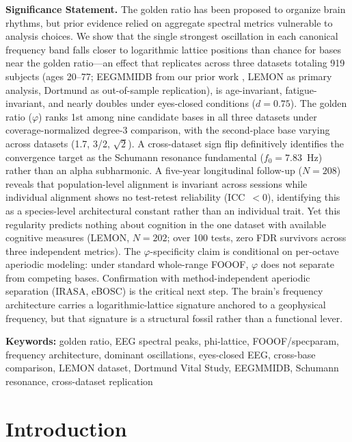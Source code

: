 \documentclass[11pt,a4paper]{article}
\newcommand{\phisym}{\varphi}
\begin{document}
\bigskip
\noindent\textbf{Significance Statement.}
The golden ratio has been proposed to organize brain rhythms, but prior evidence relied on aggregate spectral metrics vulnerable to analysis choices. We show that the single strongest oscillation in each canonical frequency band falls closer to logarithmic lattice positions than chance for bases near the golden ratio---an effect that replicates across three datasets totaling 919 subjects (ages 20--77; EEGMMIDB from our prior work \parencite{Lacy2026paper2}, LEMON as primary analysis, Dortmund as out-of-sample replication), is age-invariant, fatigue-invariant, and nearly doubles under eyes-closed conditions ($d = 0.75$). The golden ratio ($\phisym$) ranks 1st among nine candidate bases in all three datasets under coverage-normalized degree-3 comparison, with the second-place base varying across datasets (1.7, 3/2, $\sqrt{2}$). A cross-dataset sign flip definitively identifies the convergence target as the Schumann resonance fundamental ($f_0 = 7.83$~Hz) rather than an alpha subharmonic. A five-year longitudinal follow-up ($N = 208$) reveals that population-level alignment is invariant across sessions while individual alignment shows no test-retest reliability (ICC~$< 0$), identifying this as a species-level architectural constant rather than an individual trait. Yet this regularity predicts nothing about cognition in the one dataset with available cognitive measures (LEMON, $N = 202$; over 100 tests, zero FDR survivors across three independent metrics). The $\phisym$-specificity claim is conditional on per-octave aperiodic modeling: under standard whole-range FOOOF, $\phisym$ does not separate from competing bases. Confirmation with method-independent aperiodic separation (IRASA, eBOSC) is the critical next step. The brain's frequency architecture carries a logarithmic-lattice signature anchored to a geophysical frequency, but that signature is a structural fossil rather than a functional lever.

\bigskip
\noindent\textbf{Keywords:} golden ratio, EEG spectral peaks, phi-lattice, FOOOF/specparam, frequency architecture, dominant oscillations, eyes-closed EEG, cross-base comparison, LEMON dataset, Dortmund Vital Study, EEGMMIDB, Schumann resonance, cross-dataset replication

\newpage
\tableofcontents
\newpage

\section{Introduction}
\end{document}
